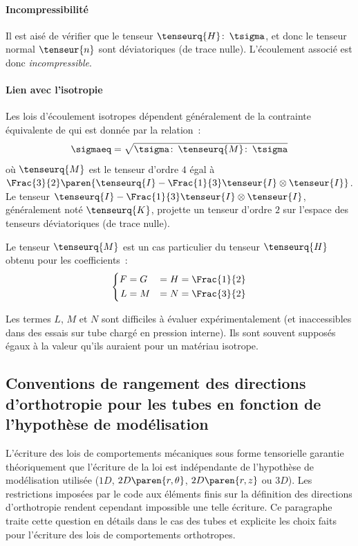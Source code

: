 \paragraph{Incompressibilité} Il est aisé de vérifier que le tenseur
\(\tenseurq{H}\colon\, \tsigma\), et donc le tenseur normal
\(\tenseur{n}\) sont déviatoriques (de trace nulle).  L'écoulement
associé est donc {\em incompressible}.

\paragraph{Lien avec l'isotropie} Les lois d'écoulement isotropes
dépendent généralement de la contrainte équivalente de  qui est donnée par la relation~:
\[
\sigmaeq = \sqrt{\tsigma\colon\,\tenseurq{M}\colon\, \tsigma}
\]
où \(\tenseurq{M}\) est le tenseur d'ordre \(4\) égal à
\(\Frac{3}{2}\paren{\tenseurq{I}-\Frac{1}{3}\tenseur{I}\otimes\tenseur{I}}\).
Le tenseur \(\tenseurq{I}-\Frac{1}{3}\tenseur{I}\otimes\tenseur{I}\),
généralement noté \(\tenseurq{K}\), projette un tenseur d'ordre \(2\)
sur l'espace des tenseurs déviatoriques (de trace nulle).

Le tenseur \(\tenseurq{M}\) est un cas particulier du tenseur
\(\tenseurq{H}\) obtenu pour les coefficients~:
\[
\left\{
  \begin{aligned}
    F &= G &= H &= \Frac{1}{2} \\
    L &= M &= N &= \Frac{3}{2}
  \end{aligned}
\right.
\]

Les termes \(L\), \(M\) et \(N\) sont difficiles à évaluer
expérimentalement (et inaccessibles dans des essais sur tube chargé en
pression interne). Ils sont souvent supposés égaux à la valeur qu'ils
auraient pour un matériau isotrope.

\subsection{Conventions de rangement des directions d'orthotropie pour
  les tubes en fonction de l'hypothèse de modélisation}
\label{sec:conv-de-rang}

L'écriture des lois de comportements mécaniques sous forme tensorielle
garantie théoriquement que l'écriture de la loi est indépendante de
l'hypothèse de modélisation utilisée (\(1D\), \(2D\paren{r,\theta}\),
\(2D\paren{r,z}\) ou \(3D\)). Les restrictions imposées par le code aux
éléments finis \castem{} sur la définition des directions d'orthotropie
rendent cependant impossible une telle écriture. Ce paragraphe traite
cette question en détails dans le cas des tubes et explicite les choix
faits pour l'écriture des lois de comportements orthotropes.

